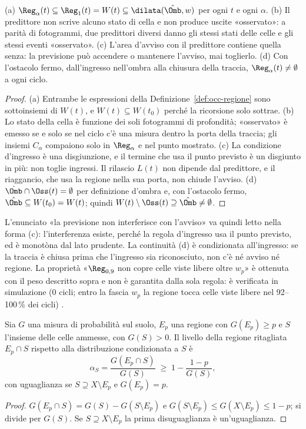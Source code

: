 \begin{proposizione}\label{prop:occ-annidamento}
(a) $\Reg_\alpha(t)\subseteq\Reg_1(t)=W(t)\subseteq\dilata(\hat\Omb,w)$ per ogni $t$ e ogni $\alpha$. (b) Il predittore non scrive alcuno stato di cella e non produce uscite «osservato»: a parità di fotogrammi, due predittori diversi danno gli stessi stati delle celle e gli stessi eventi «osservato». (c) L'area d'avviso con il predittore contiene quella senza: la previsione può accendere o mantenere l'avviso, mai toglierlo. (d) Con l'ostacolo fermo, dall'ingresso nell'ombra alla chiusura della traccia, $\Reg_\alpha(t)\neq\emptyset$ a ogni ciclo. 
\end{proposizione}
\begin{proof}
(a) Entrambe le espressioni della Definizione~\ref{def:occ-regione} sono sottoinsiemi di $W(t)$, e $W(t)\subseteq W(t_0)$ perché la ricorsione solo sottrae. (b) Lo stato della cella è funzione dei soli fotogrammi di profondità; «osservato» è emesso se e solo se nel ciclo c'è una misura dentro la porta della traccia; gli insiemi $C_\alpha$ compaiono solo in $\Reg_\alpha$ e nel punto mostrato. (c) La condizione d'ingresso è una disgiunzione, e il termine che usa il punto previsto è un disgiunto in più: non toglie ingressi. Il rilascio $L(t)$ non dipende dal predittore, e il riaggancio, che usa la regione nella sua porta, non chiude l'avviso. (d) $\hat\Omb\cap\Oss(t)=\emptyset$ per definizione d'ombra e, con l'ostacolo fermo, $\hat\Omb\subseteq W(t_0)=W(t)$; quindi $W(t)\setminus\Oss(t)\supseteq\hat\Omb\neq\emptyset$.
\end{proof}

L'enunciato «la previsione non interferisce con l'avviso» va quindi letto nella forma (c): l'interferenza esiste, perché la regola d'ingresso usa il punto previsto, ed è monotòna dal lato prudente. La continuità (d) è condizionata all'ingresso: se la traccia è chiusa prima che l'ingresso sia riconosciuto, non c'è né avviso né regione. La proprietà «$\Reg_{0,9}$ non copre celle viste libere oltre $w_p$» è ottenuta con il peso descritto sopra e non è garantita dalla sola regola: è verificata in simulazione (0 cicli; entro la fascia $w_p$ la regione tocca celle viste libere nel 92--100\,\% dei cicli) .

\begin{proposizione}\label{prop:occ-ritaglio}
Sia $G$ una misura di probabilità sul suolo, $E_p$ una regione con $G(E_p)\ge p$ e $S$ l'insieme delle celle ammesse, con $G(S)>0$. Il livello della regione ritagliata $E_p\cap S$ rispetto alla distribuzione condizionata a $S$ è
\begin{equation}\label{eq:occ-ritaglio}
\alpha_S=\frac{G(E_p\cap S)}{G(S)}\;\ge\;1-\frac{1-p}{G(S)},
\end{equation}
con uguaglianza se $S\supseteq X\setminus E_p$ e $G(E_p)=p$. 
\end{proposizione}
\begin{proof}
$G(E_p\cap S)=G(S)-G(S\setminus E_p)$ e $G(S\setminus E_p)\le G(X\setminus E_p)\le1-p$; si divide per $G(S)$. Se $S\supseteq X\setminus E_p$ la prima disuguaglianza è un'uguaglianza.
\end{proof}

